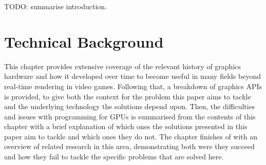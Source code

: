 \documentclass[a4paper,12pt,twoside,openright]{report}
\begin{document}
TODO: summarise introduction.

\chapter{Technical Background}






This chapter provides extensive coverage of the relevant history of graphics
hardware and how it developed over time to become useful in many fields beyond
real-time rendering in video games. Following that, a breakdown of graphics
APIs is provided, to give both the context for the problem this paper aims to
tackle and the underlying technology the solutions depend upon. Then, the
difficulties and issues with programming for GPUs is summarised from the
contents of this chapter with a brief explanation of which ones the solutions
presented in this paper aim to tackle and which ones they do not. The chapter
finishes of with an overview of related research in this area, demonstrating
both were they succeed and how they fail to tackle the specific problems that
are solved here.
\end{document}
